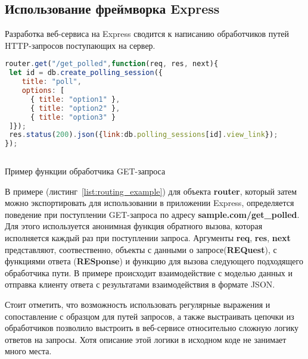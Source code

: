 \subsection{Использование фреймворка Express}
Разработка веб-сервиса на Express сводится к написанию обработчиков путей HTTP-запросов поступающих на сервер.
\begin{ListingEnv}[H]
\begin{lstlisting}[language=JavaScript]
router.get("/get_polled",function(req, res, next){
 let id = db.create_polling_session({
	title: "poll",
	options: [
	  { title: "option1" },
	  { title: "option2" },
	  { title: "option3" }
 ]});
 res.status(200).json({link:db.polling_sessions[id].view_link});
});
	
\end{lstlisting}
\caption{Пример функции обработчика GET-запроса}
\label{list:routing_example}
\end{ListingEnv}
В примере (листинг~\ref{list:routing_example}) для объекта \textbf{router}, который затем можно экспортировать для использовании в приложении Express, определяется поведение при поступлении GET-запроса по адресу \textbf{sample.com/get\_polled}. Для этого используется анонимная функция обратного вызова, которая исполняется каждый раз при поступлении запроса. Аргументы \textbf{req}, \textbf{res}, \textbf{next} представляют, соотвественно, объекты с данными о запросе(\textbf{REQuest}), с функциями ответа (\textbf{RESponse}) и функцию для вызова следующего подходящего обработчика пути. В примере происходит взаимодействие с моделью данных и отправка клиенту ответа с результатами взаимодействия в формате JSON.

Стоит отметить, что возможность использовать регулярные выражения и сопоставление с образцом для путей запросов, а также выстраивать цепочки из обработчиков позволило выстроить в веб-сервисе относительно сложную логику ответов на запросы. Хотя описание этой логики в исходном коде не занимает много места.  

